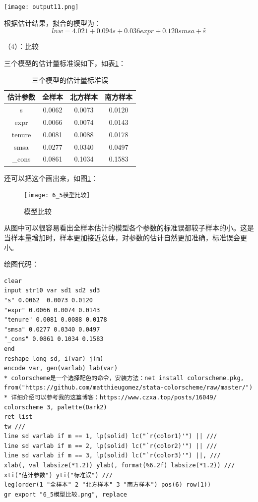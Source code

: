 \documentclass[cn,fancy,blue,11pt]{elegantbook}
\begin{document}
\noindent\texttt{[image: output11.png]}

根据估计结果，拟合的模型为：
\begin{equation}
  lnw = 4.021 + 0.094s + 0.036expr + 0.120smsa +\hat{\varepsilon}
\end{equation}

（4）：比较

三个模型的估计量标准误如下，如表\ref{tab:table1}：

\begin{table}[htbp]
  \centering
  \caption{三个模型的估计量标准误}
  \label{tab:table1}
  \begin{tabular}{cccc}
    \toprule
    估计参数 & 全样本 & 北方样本 & 南方样本\tabularnewline
    \midrule
    s & 0.0062 & 0.0073 & 0.0120\tabularnewline
    expr & 0.0066 & 0.0074 & 0.0143\tabularnewline
    tenure & 0.0081 & 0.0088 & 0.0178\tabularnewline
    smsa & 0.0277 & 0.0340 & 0.0497\tabularnewline
    \_cons & 0.0861 & 0.1034 & 0.1583\tabularnewline
    \bottomrule
  \end{tabular}
\end{table}

还可以把这个画出来，如图\ref{fig:pic65}：

\begin{figure}
  \centering
  \texttt{[image: 6\_5模型比较]}
  \caption{模型比较}
  \label{fig:pic65}
\end{figure}

从图中可以很容易看出全样本估计的模型各个参数的标准误都较子样本的小。这是当样本量增加时，样本更加接近总体，对参数的估计自然更加准确，标准误会更小。

绘图代码：

\begin{lstlisting}
clear
input str10 var sd1 sd2 sd3
"s" 0.0062  0.0073 0.0120
"expr" 0.0066 0.0074 0.0143
"tenure" 0.0081 0.0088 0.0178
"smsa" 0.0277 0.0340 0.0497
"_cons" 0.0861 0.1034 0.1583
end
reshape long sd, i(var) j(m)
encode var, gen(varlab) lab(var)
* colorscheme是一个选择配色的命令，安装方法：net install colorscheme.pkg, from("https://github.com/matthieugomez/stata-colorscheme/raw/master/")
* 详细介绍可以参考我的这篇博客：https://www.czxa.top/posts/16049/
colorscheme 3, palette(Dark2)
ret list
tw ///
line sd varlab if m == 1, lp(solid) lc("`r(color1)'") || ///
line sd varlab if m == 2, lp(solid) lc("`r(color2)'") || ///
line sd varlab if m == 3, lp(solid) lc("`r(color3)'") ||, ///
xlab(, val labsize(*1.2)) ylab(, format(%6.2f) labsize(*1.2)) ///
xti("估计参数") yti("标准误") ///
leg(order(1 "全样本" 2 "北方样本" 3 "南方样本") pos(6) row(1))
gr export "6_5模型比较.png", replace
\end{lstlisting}
\end{document}
